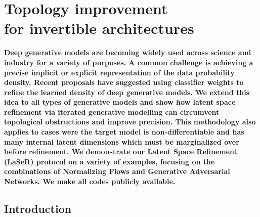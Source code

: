%
%
%

\chapter[Topology improvement for invertible architectures]{Topology improvement \\for invertible architectures}\label{chap:lsr}
\enlargethispage{2ex}
\vspace*{-2pt}

\enlargethispage{2ex}

{\bf Deep generative models are becoming widely used across science and industry for a variety of purposes. A common challenge is achieving a precise implicit or explicit representation of the data probability density.  Recent proposals have suggested using classifier weights to refine the learned density of deep generative models.  We extend this idea to all types of generative models and show how latent space refinement via iterated generative modelling can circumvent topological obstructions and improve precision. This methodology also applies to cases were the target model is non-differentiable and has many internal latent dimensions which must be marginalized over before refinement. We demonstrate our Latent Space Refinement (LaSeR) protocol on a variety of examples, focusing on the combinations of Normalizing Flows and Generative Adversarial Networks. We make all codes publicly available.}

\section{Introduction}
\label{sec:lsrintro}

